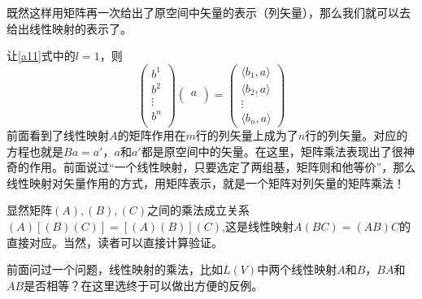 \documentclass[11pt,a4paper,openany]{book}%
\theoremstyle{plain}%
\begin{document}
既然这样用矩阵再一次给出了原空间中矢量的表示（列矢量），那么我们就可以去给出线性映射的表示了。

让\eqref{a11}式中的$l=1$，则
\begin{equation}
\begin{pmatrix}
b^{1}\\
b^{2} \\
\vdots \\
b^{n}\\
\end{pmatrix}
\begin{pmatrix}
a \\
\end{pmatrix}
=
\begin{pmatrix}
\langle b_1,a \rangle \\
\langle b_2,a \rangle \\
\vdots \\
\langle b_n,a \rangle
\end{pmatrix}
\end{equation}
\indent 前面看到了线性映射$A$的矩阵作用在$m$行的列矢量上成为了$n$行的列矢量。对应的方程也就是$Ba=a'$，$a$和$a'$都是原空间中的矢量。在这里，矩阵乘法表现出了很神奇的作用。前面说过“一个线性映射，只要选定了两组基，矩阵则和他等价”，那么线性映射对矢量作用的方式，用矩阵表示，就是一个矩阵对列矢量的矩阵乘法！

显然矩阵$(A),(B),(C)$之间的乘法成立关系$(A)[(B)(C)]=[(A)(B)](C)$,这是线性映射$A(BC)=(AB)C$的直接对应。当然，读者可以直接计算验证。

前面问过一个问题，线性映射的乘法，比如$L(V)$中两个线性映射$A$和$B$，$BA$和$AB$是否相等？在这里选终于可以做出方便的反例。
\end{document}
